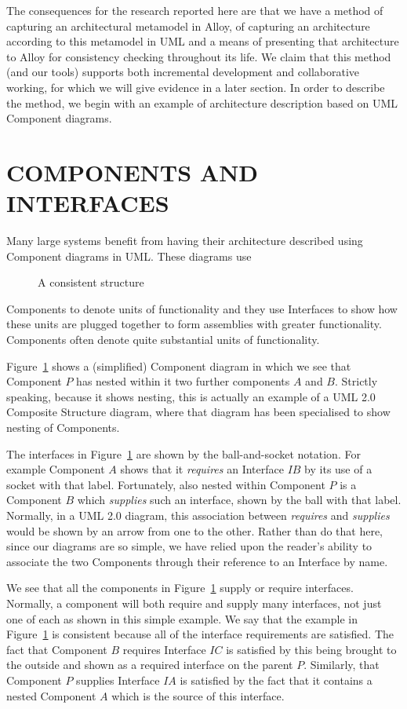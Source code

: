\documentclass[a4paper,twoside]{article}
\begin{document}
The consequences for the research reported here are that we have a method of capturing an architectural metamodel in Alloy, of capturing an architecture according to this metamodel in UML and a means of presenting that architecture to Alloy for consistency checking throughout its life. We claim that this method (and our tools) supports both incremental development and collaborative working, for which we will give evidence in a later section. In order to describe the method, we begin with an example of architecture description based on UML Component diagrams. 


\section{\uppercase{Components and Interfaces}}

\noindent Many large systems benefit from having their architecture described using Component diagrams in UML. These diagrams use 
%
\begin{figure}[!h]
  \centering
   {}
  \caption{A consistent structure}
  \label{fig:fig1}
\end{figure}
%
Components to denote units of functionality and they use Interfaces to show how these units are plugged together to form assemblies with greater functionality. Components often denote quite substantial units of functionality.

Figure~\ref{fig:fig1} shows a (simplified) Component diagram in which we see that Component $P$ has nested within it two further components $A$ and $B$. Strictly speaking, because it shows nesting, this is actually an example of a UML 2.0 Composite Structure diagram, where that diagram has been specialised to show nesting of Components.

The interfaces in Figure~\ref{fig:fig1} are shown by the ball-and-socket notation. For example Component $A$ shows that it {\em requires} an Interface $IB$ by its use of a socket with that label. Fortunately, also nested within Component $P$ is a Component $B$ which {\em supplies} such an interface, shown by the ball with that label. Normally, in a UML 2.0 diagram, this association between {\em requires} and {\em supplies} would be shown by an arrow from one to the other. Rather than do that here, since our diagrams are so simple, we have relied upon the reader's ability to associate the two Components through their reference to an Interface by name.

We see that all the components in Figure~\ref{fig:fig1}  supply or require interfaces. Normally, a component will both require and supply many interfaces, not just one of each as shown in this simple example. We say that the example in Figure~\ref{fig:fig1} is consistent because all of the interface requirements are satisfied. The fact that Component $B$ requires Interface $IC$ is satisfied by this being brought to the outside and shown as a required interface on the parent $P$. Similarly, that Component $P$ supplies Interface $IA$ is satisfied by the fact that it contains a nested Component $A$ which is the source of this interface.
\end{document}
